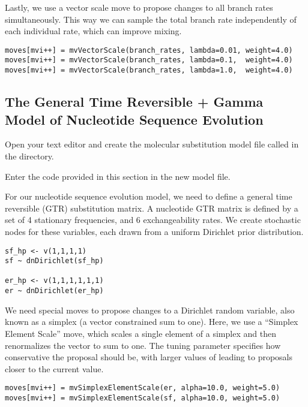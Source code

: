 Lastly, we use a vector scale move to propose changes to all branch rates simultaneously.
This way we can sample the total branch rate independently of each individual rate, which can improve mixing.
{\tt \begin{snugshade*}
\begin{lstlisting}
moves[mvi++] = mvVectorScale(branch_rates, lambda=0.01, weight=4.0) 
moves[mvi++] = mvVectorScale(branch_rates, lambda=0.1,  weight=4.0) 
moves[mvi++] = mvVectorScale(branch_rates, lambda=1.0,  weight=4.0)
\end{lstlisting}
\end{snugshade*}}

\bigskip

\subsection{The General Time Reversible + Gamma Model of Nucleotide Sequence Evolution}\label{subsect:RB-ModelGTRG}

{\begin{framed}
Open your text editor and create the molecular substitution model file called {\textcolor{red}{}} in the  directory.

Enter the \Rev code provided in this section in the new model file.
\end{framed}}

For our nucleotide sequence evolution model, we need to define a general time reversible (GTR) substitution matrix.
A nucleotide GTR matrix is defined by a set of 4 stationary frequencies, and 6 exchangeability rates.
We create stochastic nodes for these variables, each drawn from a uniform Dirichlet prior distribution.

{\tt \begin{snugshade*}
\begin{lstlisting}
sf_hp <- v(1,1,1,1)
sf ~ dnDirichlet(sf_hp)

er_hp <- v(1,1,1,1,1,1)
er ~ dnDirichlet(er_hp)
\end{lstlisting}
\end{snugshade*}}

We need special moves to propose changes to a Dirichlet random variable, also known as a simplex (a vector constrained sum to one).
Here, we use a ``Simplex Element Scale'' move, which scales a single element of a simplex and then renormalizes the vector to sum to one.
The tuning parameter  specifies how conservative the proposal should be, with larger values of  leading to proposals closer to the current value.
{\tt \begin{snugshade*}
\begin{lstlisting}
moves[mvi++] = mvSimplexElementScale(er, alpha=10.0, weight=5.0)
moves[mvi++] = mvSimplexElementScale(sf, alpha=10.0, weight=5.0)
\end{lstlisting}
\end{snugshade*}}

